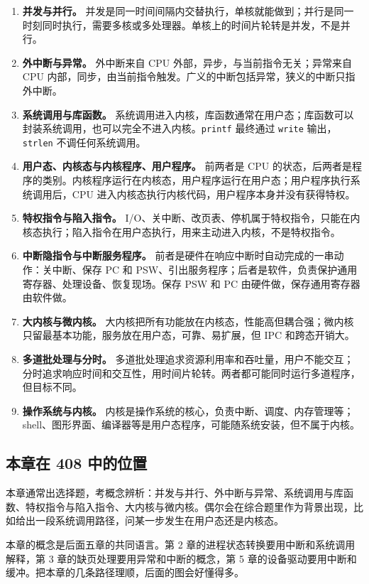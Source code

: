 \begin{enumerate}
    \item \textbf{并发与并行。} 并发是同一时间间隔内交替执行，单核就能做到；并行是同一时刻同时执行，需要多核或多处理器。单核上的时间片轮转是并发，不是并行。
    \item \textbf{外中断与异常。} 外中断来自 CPU 外部，异步，与当前指令无关；异常来自 CPU 内部，同步，由当前指令触发。广义的中断包括异常，狭义的中断只指外中断。
    \item \textbf{系统调用与库函数。} 系统调用进入内核，库函数通常在用户态；库函数可以封装系统调用，也可以完全不进入内核。\texttt{printf} 最终通过 \texttt{write} 输出，\texttt{strlen} 不调任何系统调用。
    \item \textbf{用户态、内核态与内核程序、用户程序。} 前两者是 CPU 的状态，后两者是程序的类别。内核程序运行在内核态，用户程序运行在用户态；用户程序执行系统调用后，CPU 进入内核态执行内核代码，用户程序本身并没有获得特权。
    \item \textbf{特权指令与陷入指令。} I/O、关中断、改页表、停机属于特权指令，只能在内核态执行；陷入指令在用户态执行，用来主动进入内核，不是特权指令。
    \item \textbf{中断隐指令与中断服务程序。} 前者是硬件在响应中断时自动完成的一串动作：关中断、保存 PC 和 PSW、引出服务程序；后者是软件，负责保护通用寄存器、处理设备、恢复现场。保存 PSW 和 PC 由硬件做，保存通用寄存器由软件做。
    \item \textbf{大内核与微内核。} 大内核把所有功能放在内核态，性能高但耦合强；微内核只留最基本功能，服务放在用户态，可靠、易扩展，但 IPC 和跨态开销大。
    \item \textbf{多道批处理与分时。} 多道批处理追求资源利用率和吞吐量，用户不能交互；分时追求响应时间和交互性，用时间片轮转。两者都可能同时运行多道程序，但目标不同。
    \item \textbf{操作系统与内核。} 内核是操作系统的核心，负责中断、调度、内存管理等；shell、图形界面、编译器等是用户态程序，可能随系统安装，但不属于内核。
\end{enumerate}

\subsection{本章在 408 中的位置}

本章通常出选择题，考概念辨析：并发与并行、外中断与异常、系统调用与库函数、特权指令与陷入指令、大内核与微内核。偶尔会在综合题里作为背景出现，比如给出一段系统调用路径，问某一步发生在用户态还是内核态。

本章的概念是后面五章的共同语言。第 2 章的进程状态转换要用中断和系统调用解释，第 3 章的缺页处理要用异常和中断的概念，第 5 章的设备驱动要用中断和缓冲。把本章的几条路径理顺，后面的图会好懂得多。

